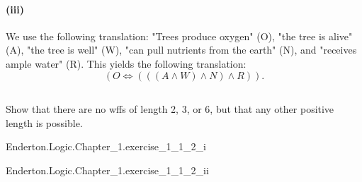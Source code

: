 \documentclass{report}
\begin{document}
\begin{answer}
    \paragraph{(iii)}%

      We use the following translation: "Trees produce oxygen" (O),
        "the tree is alive" (A), "the tree is well" (W), "can pull nutrients
        from the earth" (N), and "receives ample water" (R).
      This yields the following translation:
        $$(O \iff (((A \land W) \land N) \land R)).$$

  \end{answer}

\subsection{}%

  Show that there are no wffs of length 2, 3, or 6, but that any other positive
    length is possible.

    {Enderton.Logic.Chapter\_1.exercise\_1\_1\_2\_i}

    {Enderton.Logic.Chapter\_1.exercise\_1\_1\_2\_ii}
\end{document}
